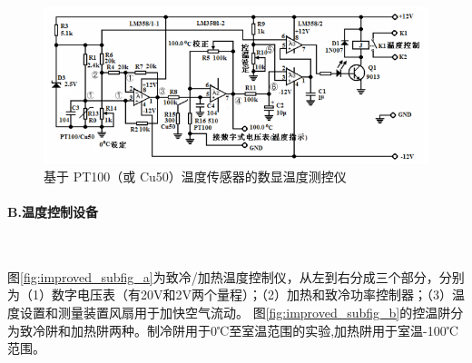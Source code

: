 \documentclass[10pt,a4paper,twocolumn,twoside,UTF8]{ctexart}
\begin{document}
	\begin{figure}[htbp]
	\centering
	\includegraphics[width=1\textwidth]{img//Diagram_Cu50.png}
	\caption{基于 PT100（或 Cu50）温度传感器的数显温度测控仪}
	\label{Diagram_Cu50}
	\end{figure}

	\paragraph{B.温度控制设备}~
	\newline

	\indent 图\ref{fig:improved_subfig_a}为致冷/加热温度控制仪，从左到右分成三个部分，分别为（1）数字电压表（有20V和2V两个量程）；（2）加热和致冷功率控制器；（3）温度设置和测量装置风扇用于加快空气流动。
	图\ref{fig:improved_subfig_b}的控温阱分为致冷阱和加热阱两种。制冷阱用于0℃至室温范围的实验,加热阱用于室温-100℃范围。
\end{document}
